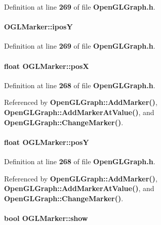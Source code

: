 Definition at line {\bf 269} of file {\bf Open\+G\+L\+Graph.\+h}.

\paragraph[{iposY}]{ O\+G\+L\+Marker\+::iposY}\label{structOGLMarker_abf98cad4f7bb963352de5646a562b5a8}


Definition at line {\bf 269} of file {\bf Open\+G\+L\+Graph.\+h}.

\paragraph[{posX}]{\setlength{\rightskip}{0pt plus 5cm}float O\+G\+L\+Marker\+::posX}\label{structOGLMarker_a04a6f72531de5ad7d2de7ad1634b6126}


Definition at line {\bf 268} of file {\bf Open\+G\+L\+Graph.\+h}.



Referenced by {\bf Open\+G\+L\+Graph\+::\+Add\+Marker()}, {\bf Open\+G\+L\+Graph\+::\+Add\+Marker\+At\+Value()}, and {\bf Open\+G\+L\+Graph\+::\+Change\+Marker()}.

\paragraph[{posY}]{\setlength{\rightskip}{0pt plus 5cm}float O\+G\+L\+Marker\+::posY}\label{structOGLMarker_af76f9d68749df1f38a03b14686a45a12}


Definition at line {\bf 268} of file {\bf Open\+G\+L\+Graph.\+h}.



Referenced by {\bf Open\+G\+L\+Graph\+::\+Add\+Marker()}, {\bf Open\+G\+L\+Graph\+::\+Add\+Marker\+At\+Value()}, and {\bf Open\+G\+L\+Graph\+::\+Change\+Marker()}.

\paragraph[{show}]{\setlength{\rightskip}{0pt plus 5cm}bool O\+G\+L\+Marker\+::show}\label{structOGLMarker_a80ceb82c4dbb51b7b1103894984c963a}



